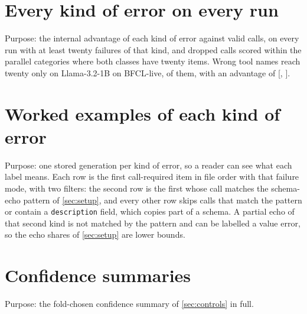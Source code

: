 \section{Every kind of error on every run}
\label{app:types}

Purpose: the internal advantage of each kind of error against valid calls, on every run with at least twenty failures of that kind, and dropped calls scored within the parallel categories where both classes have twenty items. Wrong tool names reach twenty only on Llama-3.2-1B on BFCL-live, \nPosWnLlamaOneBLive{} of them, with an advantage of \WnGapLlamaOneBLive{} [\WnGapLoLlamaOneBLive{}, \WnGapHiLlamaOneBLive{}].

\begin{center}\scriptsize\setlength{\tabcolsep}{3pt}

\end{center}

\section{Worked examples of each kind of error}
\label{app:examples}

Purpose: one stored generation per kind of error, so a reader can see what each label means. Each row is the first call-required item in file order with that failure mode, with two filters: the second row is the first whose call matches the schema-echo pattern of \cref{sec:setup}, and every other row skips calls that match the pattern or contain a \texttt{description} field, which copies part of a schema. A partial echo of that second kind is not matched by the pattern and can be labelled a value error, so the echo shares of \cref{sec:setup} are lower bounds.

\begin{center}\scriptsize\setlength{\tabcolsep}{3pt}

\end{center}

\section{Confidence summaries}
\label{app:confidence}

Purpose: the fold-chosen confidence summary of \cref{sec:controls} in full.

